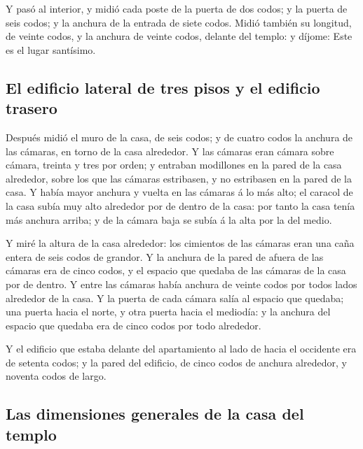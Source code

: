  Y pasó al interior, y midió cada poste de la puerta de dos
codos; y la puerta de seis codos; y la anchura de la entrada de siete
codos.  Midió también su longitud, de veinte codos, y la
anchura de veinte codos, delante del templo: y díjome: Este es el lugar
santísimo.

\hypertarget{el-edificio-lateral-de-tres-pisos-y-el-edificio-trasero}{%
\subsection{El edificio lateral de tres pisos y el edificio
trasero}\label{el-edificio-lateral-de-tres-pisos-y-el-edificio-trasero}}

 Después midió el muro de la casa, de seis codos; y de
cuatro codos la anchura de las cámaras, en torno de la casa alrededor.
 Y las cámaras eran cámara sobre cámara, treinta y tres por
orden; y entraban modillones en la pared de la casa alrededor, sobre los
que las cámaras estribasen, y no estribasen en la pared de la casa.
 Y había mayor anchura y vuelta en las cámaras á lo más
alto; el caracol de la casa subía muy alto alrededor por de dentro de la
casa: por tanto la casa tenía más anchura arriba; y de la cámara baja se
subía á la alta por la del medio.

 Y miré la altura de la casa alrededor: los cimientos de las
cámaras eran una caña entera de seis codos de grandor.  Y la
anchura de la pared de afuera de las cámaras era de cinco codos, y el
espacio que quedaba de las cámaras de la casa por de dentro.
 Y entre las cámaras había anchura de veinte codos por
todos lados alrededor de la casa.  Y la puerta de cada
cámara salía al espacio que quedaba; una puerta hacia el norte, y otra
puerta hacia el mediodía: y la anchura del espacio que quedaba era de
cinco codos por todo alrededor.

 Y el edificio que estaba delante del apartamiento al lado
de hacia el occidente era de setenta codos; y la pared del edificio, de
cinco codos de anchura alrededor, y noventa codos de largo.

\hypertarget{las-dimensiones-generales-de-la-casa-del-templo}{%
\subsection{Las dimensiones generales de la casa del
templo}\label{las-dimensiones-generales-de-la-casa-del-templo}}


